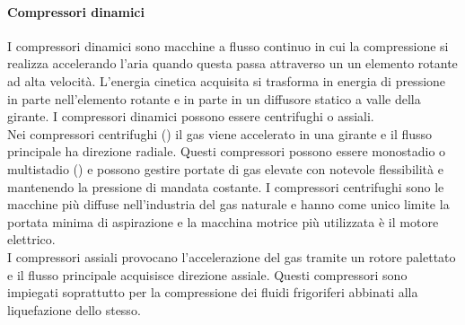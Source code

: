 \paragraph{Compressori dinamici}
I compressori dinamici sono macchine a flusso continuo in cui la compressione si realizza accelerando l'aria quando questa passa attraverso un un elemento rotante ad alta velocità. L'energia cinetica acquisita si trasforma in energia di pressione in parte nell'elemento rotante e in parte in un diffusore statico a valle della girante. I compressori dinamici possono essere centrifughi o assiali.\\
Nei compressori centrifughi () il gas viene accelerato in una girante e il flusso principale ha direzione radiale. Questi compressori possono essere monostadio o multistadio () e possono gestire portate di gas elevate con notevole flessibilità e mantenendo la pressione di mandata costante. I compressori centrifughi sono le macchine più diffuse nell'industria del gas naturale e hanno come unico limite la portata minima di aspirazione e la macchina motrice più utilizzata è il motore elettrico.\\
I compressori assiali provocano l'accelerazione del gas tramite un rotore palettato e il flusso principale acquisisce direzione assiale. Questi compressori sono impiegati soprattutto per la compressione dei fluidi frigoriferi abbinati alla liquefazione dello stesso.

